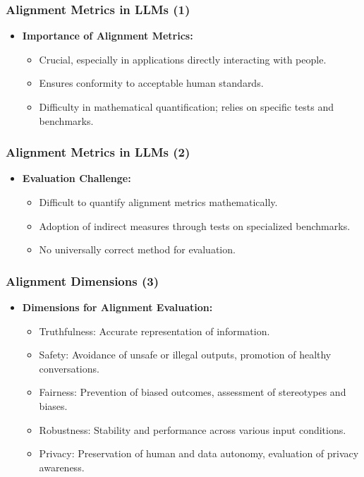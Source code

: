 \begin{frame}[fragile]\frametitle{Alignment Metrics in LLMs (1)}
  \begin{itemize}
    \item \textbf{Importance of Alignment Metrics:}
      \begin{itemize}
        \item Crucial, especially in applications directly interacting with people.
        \item Ensures conformity to acceptable human standards.
        \item Difficulty in mathematical quantification; relies on specific tests and benchmarks.
      \end{itemize}
  \end{itemize}
\end{frame}

\begin{frame}[fragile]\frametitle{Alignment Metrics in LLMs (2)}
  \begin{itemize}
    \item \textbf{Evaluation Challenge:}
      \begin{itemize}
        \item Difficult to quantify alignment metrics mathematically.
        \item Adoption of indirect measures through tests on specialized benchmarks.
        \item No universally correct method for evaluation.
      \end{itemize}
  \end{itemize}
\end{frame}

\begin{frame}[fragile]\frametitle{Alignment Dimensions (3)}
  \begin{itemize}
    \item \textbf{Dimensions for Alignment Evaluation:}
      \begin{itemize}
        \item Truthfulness: Accurate representation of information.
        \item Safety: Avoidance of unsafe or illegal outputs, promotion of healthy conversations.
        \item Fairness: Prevention of biased outcomes, assessment of stereotypes and biases.
        \item Robustness: Stability and performance across various input conditions.
        \item Privacy: Preservation of human and data autonomy, evaluation of privacy awareness.
      \end{itemize}
  \end{itemize}
\end{frame}

